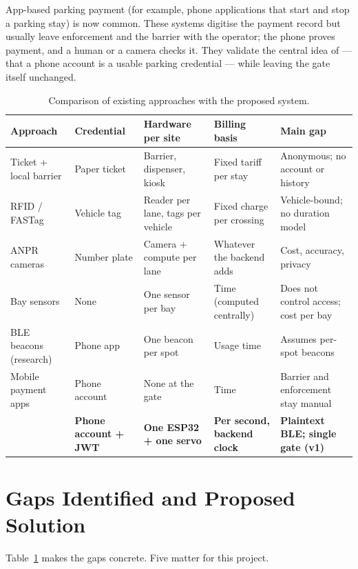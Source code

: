 App-based parking payment (for example, phone applications that start and stop a
parking stay) is now common. These systems digitise the payment record but usually
leave enforcement and the barrier with the operator; the phone proves payment, and a
human or a camera checks it. They validate the central idea of \project{} --- that a
phone account is a usable parking credential --- while leaving the gate itself
unchanged.

\begin{table}[htbp]
  \centering
  \small
  \begin{tabularx}{\textwidth}{@{}lXXXX@{}}
    \toprule
    \textbf{Approach} & \textbf{Credential} & \textbf{Hardware per site} &
    \textbf{Billing basis} & \textbf{Main gap} \\
    \midrule
    Ticket + local barrier & Paper ticket & Barrier, dispenser, kiosk &
      Fixed tariff per stay & Anonymous; no account or history \\
    RFID / FASTag & Vehicle tag & Reader per lane, tags per vehicle &
      Fixed charge per crossing & Vehicle-bound; no duration model \\
    ANPR cameras & Number plate & Camera + compute per lane &
      Whatever the backend adds & Cost, accuracy, privacy \\
    Bay sensors & None & One sensor per bay & Time (computed centrally) &
      Does not control access; cost per bay \\
    BLE beacons (research) & Phone app & One beacon per spot &
      Usage time & Assumes per-spot beacons \\
    Mobile payment apps & Phone account & None at the gate &
      Time & Barrier and enforcement stay manual \\
    \textbf{\project{}} & \textbf{Phone account + JWT} & \textbf{One ESP32 +
      one servo} & \textbf{Per second, backend clock} &
      \textbf{Plaintext BLE; single gate (v1)} \\
    \bottomrule
  \end{tabularx}
  \caption{Comparison of existing approaches with the proposed system.}
  \label{tab:comparison}
\end{table}

\section{Gaps Identified and Proposed Solution}

Table~\ref{tab:comparison} makes the gaps concrete. Five matter for this project.


